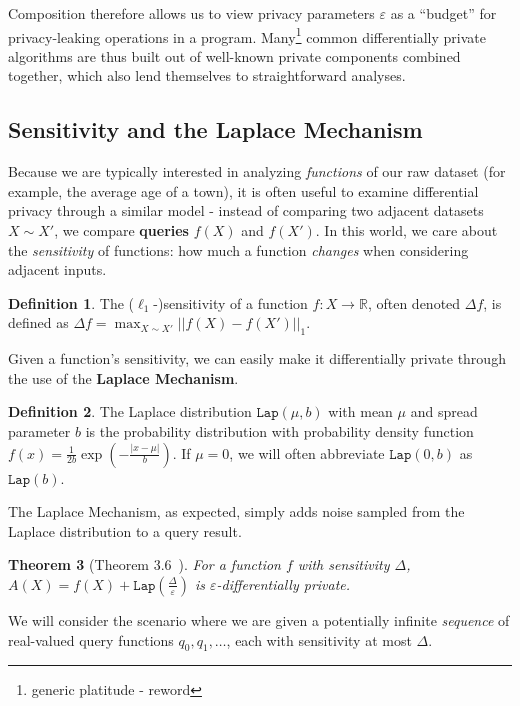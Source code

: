 \documentclass[12pt]{article}
\newcommand{\RR}{\mathbb{R}}
\newcommand{\Lap}{\texttt{Lap}}
\newtheorem{thm}{Theorem}[section]
\theoremstyle{definition}
\newtheorem{defn}[thm]{Definition}
\begin{document}
Composition therefore allows us to view privacy parameters $\varepsilon$ as a ``budget'' for privacy-leaking operations in a program. Many\footnote{generic platitude - reword} common differentially private algorithms are thus built out of well-known private components combined together, which also lend themselves to straightforward analyses. 

\subsection{Sensitivity and the Laplace Mechanism}

Because we are typically interested in analyzing \textit{functions} of our raw dataset (for example, the average age of a town), it is often useful to examine differential privacy through a similar model - instead of comparing two adjacent datasets $X\sim X'$, we compare \textbf{queries} $f(X)$ and $f(X')$. In this world, we care about the \textit{sensitivity} of functions: how much a function \textit{changes} when considering adjacent inputs.  

\begin{defn}
    The ($\ell_1$-)sensitivity of a function $f: X\to \RR$, often denoted $\Delta f$, is defined as $\Delta f = \max_{X\sim X'}||f(X)-f(X')||_1$.
\end{defn}

Given a function's sensitivity, we can easily make it differentially private through the use of the \textbf{Laplace Mechanism}.

\begin{defn}
    The Laplace distribution $\Lap(\mu, b)$ with mean $\mu$ and spread parameter $b$ is the probability distribution with probability density function $f(x) = \frac{1}{2b}\exp(-\frac{|x-\mu|}{b})$. If $\mu =0$, we will often abbreviate $\Lap(0, b)$ as $\Lap(b)$. 
\end{defn}

The Laplace Mechanism, as expected, simply adds noise sampled from the Laplace distribution to a query result. 

\begin{thm}[Theorem 3.6~\cite{dworkrothmonograph}]
    For a function $f$ with sensitivity $\Delta$, $A(X) = f(X) + \Lap(\frac{\Delta}{\varepsilon})$ is $\varepsilon$-differentially private. 
\end{thm}

We will consider the scenario where we are given a potentially infinite \textit{sequence} of real-valued query functions $q_0, q_1, \ldots$, each with sensitivity at most $\Delta$.
\end{document}
